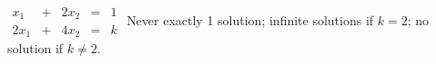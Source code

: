 {$\begin{array}{ccccc}x_1&+&2x_2&=&1\\2x_1&+&4x_2&=&k\end{array}$}
{Never exactly 1 solution; infinite solutions if $k=2$; no solution if $k\neq 2$.}